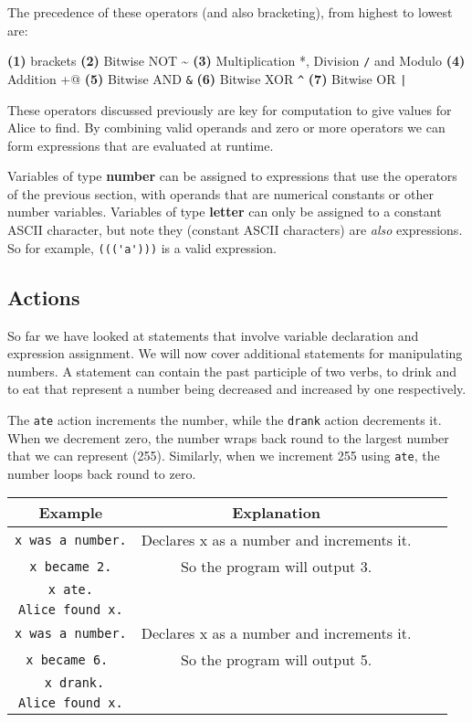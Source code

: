 \documentclass[a4wide, 10pt]{article}
\begin{document}
The precedence of these operators (and also bracketing), from highest to lowest are: 

\textbf{(1)} brackets
\textbf{(2)} Bitwise NOT \textasciitilde{}
\textbf{(3)} Multiplication *, Division \verb+/+ and Modulo \verb@%@ 
\textbf{(4)} Addition \verb@+@ 
\textbf{(5)} Bitwise AND \verb+&+
\textbf{(6)} Bitwise XOR \verb+^+  
\textbf{(7)} Bitwise OR \verb+|+


These operators discussed previously are key for computation to give values for Alice to find. 
By combining valid operands and zero or more operators we can form expressions that are evaluated at runtime.

Variables of type \textbf{number} can be assigned to expressions that use the operators 
of the previous section, with operands that are numerical constants or 
other number variables. Variables of type \textbf{letter} can only be assigned to a constant ASCII character, but note they (constant ASCII characters) are \textit{also} expressions. So for example, \verb+((('a')))+ is a valid expression.


\subsection{Actions}

So far we have looked at statements that involve variable declaration and expression assignment. We will now
cover additional statements for manipulating numbers. A statement can contain the past participle of two verbs,
to drink and to eat that represent a number being decreased and increased by one respectively. 

The \verb+ate+ action increments the number, while the \verb+drank+ action decrements it. When we decrement zero, the number wraps back round to the largest number that we can represent (255). Similarly, when we increment 255 using \verb+ate+, the number loops back round to zero. 

\begin{tabular}{|c|c|c|c|}
\hline 
Example & Explanation\tabularnewline

\hline \verb+x was a number.+& Declares x as a number and increments it.
\\\verb+x became 2.+ &  So the program will output 3.\\ \verb+x ate.+ & \\ \verb+Alice found x.+ &
\tabularnewline
\hline 
\verb+x was a number.+ & Declares x as a number and increments it. 
\\ \verb+x became 6. + & So the program will output 5. \\ \verb+ x drank.+ & \\ \verb+Alice found x.+ &
\tabularnewline
\hline 
\end{tabular}
\end{document}
